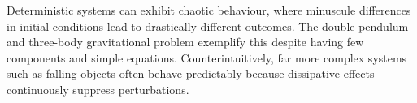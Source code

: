 Deterministic systems can exhibit chaotic behaviour, where minuscule differences in initial conditions lead to drastically different outcomes. The double pendulum and three-body gravitational problem exemplify this despite having few components and simple equations. Counterintuitively, far more complex systems such as falling objects often behave predictably because dissipative effects continuously suppress perturbations.
